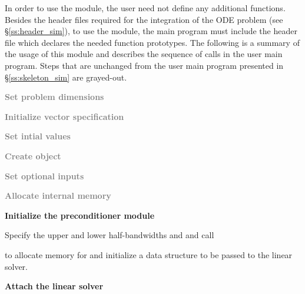 In order to use the {\cvbandpre} module, the user need not define any
additional functions. 
Besides the header files required for the integration of the ODE problem
(see \S\ref{ss:header_sim}),  to use the {\cvbandpre} module, the main program 
must include the header file  which declares the needed
function prototypes.
The following is a summary of the usage of this module and describes the sequence 
of calls in the user main program. Steps that are unchanged from the user main
program presented in \S\ref{ss:skeleton_sim} are grayed-out.
\begin{Steps}
  
\item
  \textcolor{gray}{\bf Set problem dimensions}

\item
  \textcolor{gray}{\bf Initialize vector specification}

\item
  \textcolor{gray}{\bf Set intial values}
 
\item
  \textcolor{gray}{\bf Create {\cvode} object}

\item
  \textcolor{gray}{\bf Set optional inputs}

\item
  \textcolor{gray}{\bf Allocate internal memory}

\item \label{i:bandpre_init}
  {\bf Initialize the {\cvbandpre} preconditioner module}

  Specify the upper and lower half-bandwidths  and  and call 


  to allocate memory for and initialize a data structure  to be 
  passed to the {\cvspgmr} linear solver.

\item \label{i:bandpre_attach}
  {\bf Attach the {\cvspgmr} linear solver}



\end{Steps}
